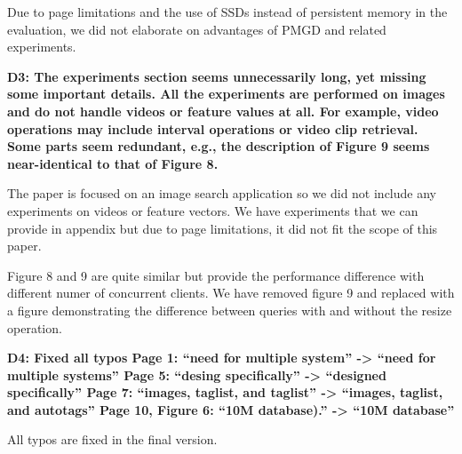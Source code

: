 \documentclass[11pt]{proposalnsf}
\begin{document}
Due to page limitations and the use of SSDs instead of persistent memory in the evaluation, we did not elaborate on advantages of PMGD and related experiments.

\bigskip
\textbf{
D3: The experiments section seems unnecessarily long, yet missing some important details. All the experiments are performed on images and do not handle videos or feature values at all. For example, video operations may include interval operations or video clip retrieval. Some parts seem redundant, e.g., the description of Figure 9 seems near-identical to that of Figure 8.
}\bigskip

The paper is focused on an image search application so we did not include any experiments on videos or feature vectors. We have experiments that we can provide in appendix but due to page limitations, it did not fit the scope of this paper.

Figure 8 and 9 are quite similar but provide the performance difference with different numer of concurrent clients. We have removed figure 9 and replaced with a figure demonstrating the difference between queries with and without the resize operation.

\bigskip
\textbf{
D4: Fixed all typos
Page 1: “need for multiple system” -> “need for multiple systems”
Page 5: “desing specifically” -> “designed specifically”
Page 7: “images, taglist, and taglist” -> “images, taglist, and autotags”
Page 10, Figure 6: “10M database).” -> “10M database”
}\bigskip

All typos are fixed in the final version.

\end{document}
